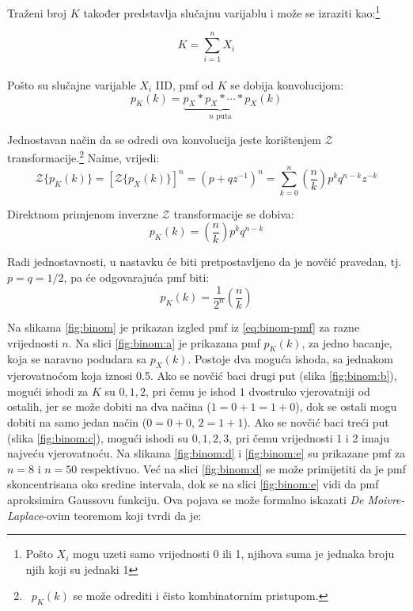 Traženi broj $K$ također predstavlja slučajnu varijablu i može se izraziti
kao:\footnote{Pošto $X_i$ mogu uzeti samo vrijednosti 0 ili 1, njihova suma je
jednaka broju njih koji su jednaki 1}

$$K = \sum_{i=1}^{n} X_i$$
\\

Pošto su slučajne varijable $X_i$ IID, pmf od $K$ se dobija konvolucijom:
$$p_K(k) = \underbrace{p_X * p_X * \cdots * p_X}_{n\text{ puta}}(k)$$

Jednostavan način da se odredi ova konvolucija jeste korištenjem
$\mathcal{Z}$ transformacije.\footnote{\ $p_K(k)$ se može odrediti i čisto
kombinatornim pristupom.}
Naime, vrijedi: %
\begin{equation}
  \mathcal{Z}\{p_K(k)\}
  = \left[\mathcal{Z}\{p_X(k)\}\right]^n
  = (p+qz^{-1})^n
  = \sum_{k=0}^{n} \left(\frac{n}{k}\right) p^k q^{n-k} z^{-k}
\end{equation}

Direktnom primjenom inverzne $ \mathcal{Z}$ transformacije se dobiva:
\begin{equation}
  p_K(k) = \left(\frac{n}{k}\right) p^kq^{n-k}
\end{equation}

Radi jednostavnosti, u nastavku će biti pretpostavljeno da je novčić pravedan,
tj. $p=q=1/2$, pa će odgovarajuća pmf biti:
\begin{equation} \label{eq:binom-pmf}
  p_K(k) = \frac{1}{2^n} \left(\frac{n}{k}\right)
\end{equation}

Na slikama \ref{fig:binom} je prikazan izgled pmf iz \eqref{eq:binom-pmf} za
razne vrijednosti $n$.  Na slici \ref{fig:binom:a} je prikazana pmf $p_K(k)$, za
jedno bacanje, koja se naravno podudara sa $p_X(k)$. Postoje dva moguća ishoda,
sa jednakom vjerovatnoćom koja iznosi 0.5. Ako se novčić baci drugi put (slika
\ref{fig:binom:b}), mogući ishodi za $K$ su $0, 1, 2$, pri čemu je ishod $1$
dvostruko vjerovatniji od ostalih, jer se može dobiti na dva načina
($1=0+1=1+0$), dok se ostali mogu dobiti na samo jedan način ($0=0+0$, $2=1+1$).
Ako se novčić baci treći put (slika \ref{fig:binom:c}), mogući ishodi su
$0,1,2,3$, pri čemu vrijednosti 1 i 2 imaju najveću vjerovatnoću. Na slikama
\ref{fig:binom:d} i \ref{fig:binom:e} su prikazane pmf za $n=8$ i $n=50$
respektivno. Već na slici \ref{fig:binom:d} se može primijetiti da je pmf
skoncentrisana oko sredine intervala, dok se na slici \ref{fig:binom:e} vidi da
pmf aproksimira Gaussovu funkciju. Ova pojava se može formalno iskazati
\textit{De Moivre-Laplace}-ovim teoremom koji tvrdi da je:

